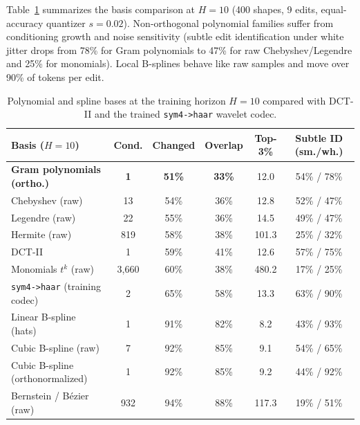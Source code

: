 \documentclass[10pt]{article}
\newcommand{\code}[1]{\texttt{#1}}
\begin{document}
Table~\ref{tab:poly_variants} summarizes the basis comparison at $H=10$ (400 shapes, 9 edits, equal-accuracy quantizer $s=0.02$).
Non-orthogonal polynomial families suffer from conditioning growth and noise sensitivity (subtle edit identification under white jitter drops from 78\% for Gram polynomials to 47\% for raw Chebyshev/Legendre and 25\% for monomials).
Local B-splines behave like raw samples and move over 90\% of tokens per edit.

\begin{table}[ht]
  \centering
  \caption{Polynomial and spline bases at the training horizon $H=10$ compared with DCT-II and the trained \code{sym4->haar} wavelet codec.}
  \label{tab:poly_variants}
  \scriptsize
  \setlength{\tabcolsep}{3.5pt}
  \begin{tabular}{@{}lccccc@{}}
    \toprule
    Basis ($H=10$) & Cond. & Changed & Overlap & Top-3\% & Subtle ID (sm./wh.) \\
    \midrule
    \textbf{Gram polynomials (ortho.)} & \textbf{1} & \textbf{51\%} & \textbf{33\%} & 12.0 & 54\% / 78\% \\
    Chebyshev (raw) & 13 & 54\% & 36\% & 12.8 & 52\% / 47\% \\
    Legendre (raw) & 22 & 55\% & 36\% & 14.5 & 49\% / 47\% \\
    Hermite (raw) & 819 & 58\% & 38\% & 101.3 & 25\% / 32\% \\
    DCT-II & 1 & 59\% & 41\% & 12.6 & 57\% / 75\% \\
    Monomials $t^k$ (raw) & 3,660 & 60\% & 38\% & 480.2 & 17\% / 25\% \\
    \code{sym4->haar} (training codec) & 2 & 65\% & 58\% & 13.3 & 63\% / 90\% \\
    Linear B-spline (hats) & 1 & 91\% & 82\% & 8.2 & 43\% / 93\% \\
    Cubic B-spline (raw) & 7 & 92\% & 85\% & 9.1 & 54\% / 65\% \\
    Cubic B-spline (orthonormalized) & 1 & 92\% & 85\% & 9.2 & 44\% / 92\% \\
    Bernstein / B\'ezier (raw) & 932 & 94\% & 88\% & 117.3 & 19\% / 51\% \\
    \bottomrule
  \end{tabular}
\end{table}
\end{document}
